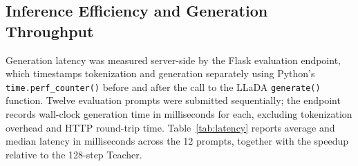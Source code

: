 \documentclass[11pt, a4paper]{article}
\begin{document}
\subsection{Inference Efficiency and Generation Throughput}
\label{subsec:efficiency_results}

Generation latency was measured server-side by the Flask evaluation endpoint, which timestamps tokenization and generation separately using Python's \texttt{time.perf\_counter()} before and after the call to the LLaDA \texttt{generate()} function. Twelve evaluation prompts were submitted sequentially; the endpoint records wall-clock generation time in milliseconds for each, excluding tokenization overhead and HTTP round-trip time. Table~\ref{tab:latency} reports average and median latency in milliseconds across the 12 prompts, together with the speedup relative to the 128-step Teacher.

\begin{table}[H]
\centering
\caption{Inference latency and speedup across all model variants (Flask server, RTX 2070 Super, 12 evaluation prompts).}
\label{tab:latency}
\end{table}
\end{document}
